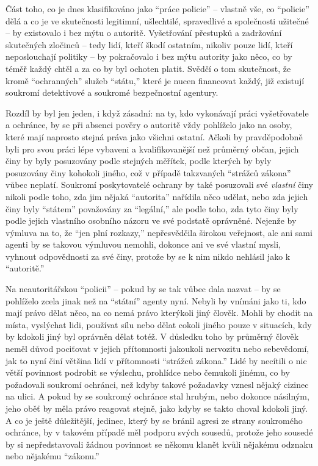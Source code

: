 \documentclass{book}
\begin{document}
Část toho, co je dnes klasifikováno jako \enquote{práce policie} -- vlastně vše, co \enquote{policie} dělá a co je ve skutečnosti legitimní, ušlechtilé, spravedlivé a společnosti užitečné -- by existovalo i bez mýtu o autoritě. Vyšetřování přestupků a zadržování skutečných zločinců -- tedy lidí, kteří škodí ostatním, nikoliv pouze lidí, kteří neposlouchají politiky -- by pokračovalo i bez mýtu autority jako něco, co by téměř každý chtěl a za co by byl ochoten platit. Svědčí o tom skutečnost, že kromě \enquote{ochranných} služeb \enquote{státu,} které je nucen financovat každý, již existují soukromí detektivové a soukromé bezpečnostní agentury.

Rozdíl by byl jen jeden, i když zásadní: na ty, kdo vykonávají práci vyšetřovatele a ochránce, by se při absenci pověry o autoritě vždy pohlíželo jako na osoby, které mají naprosto stejná práva jako všichni ostatní. Ačkoli by pravděpodobně byli pro svou práci lépe vybaveni a kvalifikovanější než průměrný občan, jejich činy by byly posuzovány podle stejných měřítek, podle kterých by byly posuzovány činy kohokoli jiného, což v případě takzvaných \enquote{strážců zákona} vůbec neplatí. Soukromí poskytovatelé ochrany by také posuzovali své \emph{vlastní} činy nikoli podle toho, zda jim nějaká \enquote{autorita} nařídila něco udělat, nebo zda jejich činy byly \enquote{státem} považovány za \enquote{legální,} ale podle toho, zda tyto činy byly podle jejich vlastního osobního názoru ve své podstatě oprávněné. Nejenže by výmluva na to, že \enquote{jen plní rozkazy,} nepřesvědčila širokou veřejnost, ale ani sami agenti by se takovou výmluvou nemohli, dokonce ani ve své vlastní mysli, vyhnout odpovědnosti za své činy, protože by se k nim nikdo nehlásil jako k \enquote{autoritě.}

Na neautoritářskou \enquote{policii} -- pokud by se tak vůbec dala nazvat -- by se pohlíželo zcela jinak než na \enquote{státní} agenty nyní. Nebyli by vnímáni jako ti, kdo mají právo dělat něco, na co nemá právo kterýkoli jiný člověk. Mohli by chodit na místa, vyslýchat lidi, používat sílu nebo dělat cokoli jiného pouze v situacích, kdy by kdokoli jiný byl oprávněn dělat totéž. V důsledku toho by průměrný člověk neměl důvod pociťovat v jejich přítomnosti jakoukoli nervozitu nebo sebevědomí, jak to nyní činí většina lidí v přítomnosti \enquote{strážců zákona.} Lidé by necítili o nic větší povinnost podrobit se výslechu, prohlídce nebo čemukoli jinému, co by požadovali soukromí ochránci, než kdyby takové požadavky vznesl nějaký cizinec na ulici. A pokud by se soukromý ochránce stal hrubým, nebo dokonce násilným, jeho oběť by měla právo reagovat stejně, jako kdyby se takto choval kdokoli jiný. A co je ještě důležitější, jedinec, který by se bránil agresi ze strany soukromého ochránce, by v takovém případě měl podporu svých sousedů, protože jeho sousedé by si nepředstavovali žádnou povinnost se někomu klanět kvůli nějakému odznaku nebo nějakému \enquote{zákonu.}
\end{document}
